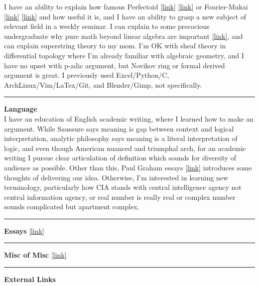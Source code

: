 \documentclass{article}
\begin{document}
\noindent
I have an ability to explain how famous Perfectoid 
\href{https://www.kurims.kyoto-u.ac.jp/~motizuki/Essential Logical Structure of Inter-universal Teichmuller Theory.pdf}{[link]}
\href{https://arxiv.org/abs/math/0409584v13}{[link]}
or Fourier-Mukai 
\href{https://arxiv.org/abs/1101.0626}{[link]}
\href{https://arxiv.org/abs/1510.05025}{[link]}
and how useful it is,
and I have an ability to grasp a new subject of relevant field in a weekly seminar.
I can explain to some precocious undergraduate why pure math beyond linear algebra are important
\href{https://kojisunami.github.io/src/what-math.pdf}{[link]},
and can explain superstring theory to my mom.
I'm OK with sheaf theory in differential topology where I'm already familiar with algebraic geometry,
and I have no upset with p-adic argument, but Novikov ring or formal derived argument is great.
I previously used Excel/Python/C, ArchLinux/Vim/LaTex/Git, and Blender/Gimp, not specifically.



\noindent\rule{\textwidth}{0.4pt}

\noindent
\textbf{Language} \\

\noindent
I have an education of English academic writing, where I learned how to make an argument.
While Saussure says meaning is gap between context and logical interpretation,
analytic philosophy says meaning is a literal interpretation of logic, and even though American nuanced and triumphal arch,
for an academic writing I pursue clear articulation of definition which sounds for diversity of audience as possible.
Other than this, Paul Graham essays \href{https://www.paulgraham.com/articles.html}{[link]}
introduces some thoughts of delivering our idea. Otherwise, I'm interested in learning new terminology,
particularly how CIA stands with central intelligence agency not central information agency,
or real number is really real or complex number sounds complicated but apartment complex.


\noindent\rule{\textwidth}{0.4pt}

\noindent
\textbf{Essays}
\href{https://kojisunami.github.io/essay.html}{[link]}


\noindent\rule{\textwidth}{0.4pt}

\noindent
\textbf{Misc of Misc}
\href{https://kojisunami.github.io/art.html}{[link]}




\noindent\rule{\textwidth}{0.4pt}

\noindent
\textbf{External Links}
\end{document}

